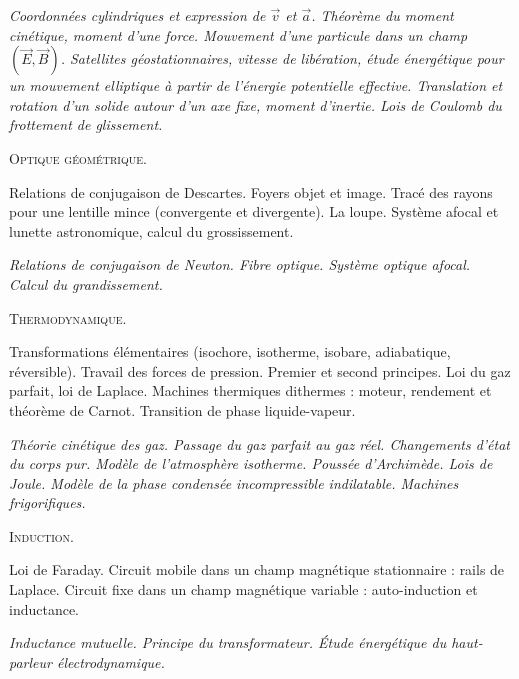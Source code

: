 \documentclass[12pt,fancy]{cours}
\begin{document}
\begin{enumerate}
{\small
\item[\Nnote] \emph{Coordonnées cylindriques et expression de $\vec{v}$ et $\vec{a}$.  Théorème du moment cinétique, moment d'une force. Mouvement d'une particule dans un champ $(\vec{E},\vec{B})$. Satellites géostationnaires, vitesse de libération, étude énergétique pour un mouvement elliptique à partir de l'énergie potentielle effective. Translation et rotation d'un solide autour d'un axe fixe, moment d'inertie. Lois de Coulomb du frottement de glissement.}
}
\medskip
\item \textsc{Optique géométrique}.
\item[\Note] Relations de conjugaison de Descartes. Foyers objet et image. Tracé des rayons pour une lentille mince (convergente et divergente). La loupe. Système afocal et lunette astronomique, calcul du grossissement.
{\small
\item[\Nnote] \emph{Relations de conjugaison de Newton. Fibre optique. Système optique afocal. Calcul du grandissement.}
}
\medskip
\item \textsc{Thermodynamique}.
\item[\Note] Transformations élémentaires (isochore, isotherme, isobare, adiabatique, réversible). Travail des forces de pression. Premier et second principes. Loi du gaz parfait, loi de Laplace. Machines thermiques dithermes : moteur, rendement et théorème de Carnot. Transition de phase liquide-vapeur.
{\small
\item[\Nnote] \emph{Théorie cinétique des gaz. Passage du gaz parfait au gaz réel. Changements d'état du corps pur. Modèle de l'atmosphère isotherme. Poussée d'Archimède. Lois de Joule. Modèle de la phase condensée incompressible indilatable. Machines frigorifiques.}
}
\medskip
\item \textsc{Induction}.
\item[\Note] Loi de Faraday. Circuit mobile dans un champ magnétique stationnaire : rails de Laplace.  Circuit fixe dans un champ magnétique variable : auto-induction et inductance.
{\small
\item[\Nnote] \emph{Inductance mutuelle. Principe du transformateur. Étude énergétique du haut-parleur électrodynamique.}
}
\end{enumerate}
\end{document}
